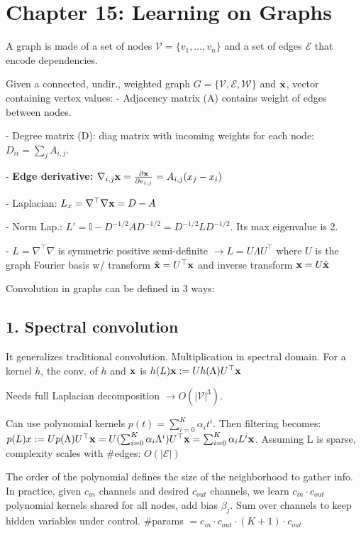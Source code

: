 \section*{Chapter 15: Learning on Graphs}
A graph is made of a set of nodes $\mathcal V = \{v_1, \hdots, v_n\}$ and a set of edges $\mathcal E$ that encode dependencies.

Given a connected, undir., weighted graph $G=\{\mathcal{V, E, W}\}$ and $\mathbf{x}$, vector containing vertex values:
- Adjacency matrix (A) contains weight of edges between nodes.

- Degree matrix (D): diag matrix with incoming weights for each node: $D_{ii} = \sum_{j}A_{i,j}$.

- \textbf{Edge derivative: } $\nabla_{i,j}\mathbf{x} = \frac{\partial\mathbf{x}}{\partial e_{i,j}} = A_{i,j}(x_j-x_i)$

- Laplacian: $L_x = \nabla^\top\nabla\mathbf{x} = D-A$

- Norm Lap.: $L' = \mathbb{I}-D^{-1/2}AD^{-1/2} = D^{-1/2}LD^{-1/2}$. Its max eigenvalue is 2.

- $L = \nabla^\top\nabla$ is symmetric positive semi-definite $\to L=U\Lambda U^\top$ where $U$ is the graph Fourier basis w/ transform $\hat{\mathbf{x}} = U^\top\mathbf{x}$ and inverse transform $\mathbf{x} = U\hat{\mathbf{x}}$

Convolution in graphs can be defined in 3 ways:

\subsection*{1. Spectral convolution}
It generalizes traditional convolution. Multiplication in spectral domain. For a kernel $h$, the conv. of $h$ and $\mathbf{x}$ is $h(L)\mathbf{x} := Uh(\Lambda)U^\top\mathbf{x} $

Needs full Laplacian decomposition $\to O(|\mathcal V|^3)$.

Can use polynomial kernels $p(t) = \sum_{i=0}^K\alpha_it^i$. Then filtering becomes: $p(L)x := Up(\Lambda)U^\top\mathbf{x} = U(\sum_{i=0}^K\alpha_i\Lambda^i)U^\top\mathbf{x} = \sum_{i=0}^K\alpha_iL^i\mathbf{x}$. Assuming L is sparse, complexity scales with \#edges: $O(|\mathcal E|)$

The order of the polynomial defines the size of the neighborhood to gather info. In practice, given $c_{in}$ channels and desired $c_{out}$ channels, we learn $c_{in} \cdot c_{out}$ polynomial kernels shared for all nodes, add bias $\beta_j$. Sum over channels to keep hidden variables under control. \#params $= c_{in}\cdot c_{out}\cdot(K+1)\cdot c_{out}$

